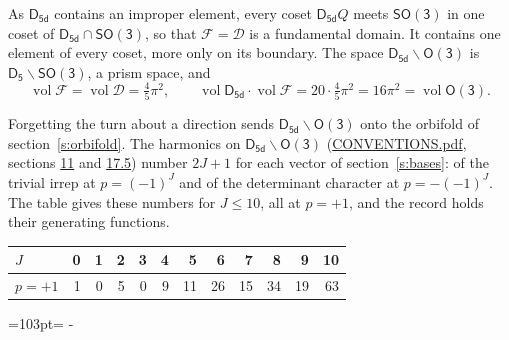 \documentclass[10pt,a4paper]{article}
\newcommand{\needspace}[1]{\par\penalty-100\begingroup\dimen0=#1\relax\dimen2=\pagegoal
  \advance\dimen2-\pagetotal\ifdim\dimen0>\dimen2\relax\ifdim\dimen2>0pt\vfil\break\fi\fi
  \endgroup}
\numberwithin{equation}{section}
\newcommand{\grp}[1]{\mathsf{#1}}
\newcommand{\vol}{\operatorname{vol}}
\newcommand{\fcell}{\mathcal{D}}
\newcommand{\fdomain}{\mathcal{F}}
\begin{document}
\leavevmode\label{n:set.fundamental}As $\grp{D_{5d}}$ contains an improper element, every coset $\grp{D_{5d}}Q$ meets \href{SO3.pdf}{$\grp{SO(3)}$} in one coset of $\grp{D_{5d}} \cap \grp{SO(3)}$, so that $\fdomain = \fcell$ is a fundamental domain. It contains one element of every coset, more only on its boundary.
The space $\grp{D_{5d}}\backslash\grp{O(3)}$ is $\grp{D_{5}}\backslash\grp{SO(3)}$, a prism space, and
\begin{equation}\label{e:volume}\vol\fdomain = \vol\fcell = \tfrac{4}{5}\pi^2,\qquad \vol\grp{D_{5d}}\cdot\vol\fdomain = 20\cdot \tfrac{4}{5}\pi^2 = 16\pi^2 = \vol\grp{O(3)}.\end{equation}

Forgetting the turn about a direction sends $\grp{D_{5d}}\backslash\grp{O(3)}$ onto the orbifold of section~\ref{s:orbifold}.
The harmonics on $\grp{D_{5d}}\backslash\grp{O(3)}$ (\href{../../CONVENTIONS.pdf}{CONVENTIONS.pdf}, sections \href{../../CONVENTIONS.pdf\#conv.11}{11} and \href{../../CONVENTIONS.pdf\#conv.17.5}{17.5}) number $2J + 1$ for each vector of section~\ref{s:bases}: of the trivial irrep at $p = (-1)^J$ and of the determinant character at $p = -(-1)^J$. The table gives these numbers for $J \le 10$, all at $p = +1$, and the record holds their generating functions.
{\small\setlength{\tabcolsep}{4pt}\begin{longtable}{@{}lrrrrrrrrrrr@{}}\toprule
$J$ & 0 & 1 & 2 & 3 & 4 & 5 & 6 & 7 & 8 & 9 & 10\\\midrule\endhead
\bottomrule\endfoot\endlastfoot
$p = +1$ & 1 & 0 & 5 & 0 & 9 & 11 & 26 & 15 & 34 & 19 & 63\\
\bottomrule\end{longtable}}
\needspace{103pt}
\end{document}
